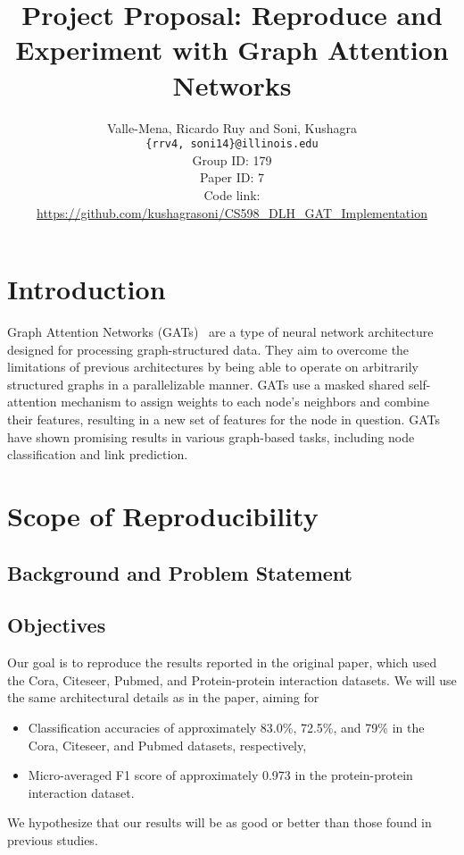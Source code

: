 \documentclass{article}
\title{Project Proposal: Reproduce and Experiment with Graph Attention Networks}
\author
{Valle-Mena, Ricardo Ruy and Soni, Kushagra \\
    \texttt{\{rrv4, soni14\}@illinois.edu}
    \\[2em]
    Group ID: 179\\
    Paper ID: 7\\
    Code link: \url{https://github.com/kushagrasoni/CS598_DLH_GAT_Implementation}
    \\[2em]
}
\begin{document}
    \maketitle

    \section{Introduction}\label{sec:introduction}

    Graph Attention Networks (GATs)~\cite{velickovic2018graph} are a type of neural network architecture designed for
    processing graph-structured data.
    They aim to overcome the limitations of previous architectures by being able to operate on arbitrarily structured graphs in a parallelizable manner.
    GATs use a masked shared self-attention mechanism to assign weights to each node's neighbors and combine their features, resulting in a new set of features for the node in question.
    GATs have shown promising results in various graph-based tasks, including node classification and link prediction.

    \section{Scope of Reproducibility}\label{sec:scope-of-reproducibility}

    \subsection{Background and Problem Statement}\label{sec:background-and-problem-statement}
    

    \subsection{Objectives}\label{sec:objectives}
    Our goal is to reproduce the results reported in the original paper, which used the Cora, Citeseer, Pubmed, and Protein-protein interaction datasets.
    We will use the same architectural details as in the paper, aiming for
    \begin{itemize}
        \item Classification accuracies of approximately 83.0\%, 72.5\%, and 79\% in the Cora, Citeseer, and Pubmed
        datasets, respectively,
        \item Micro-averaged F1 score of approximately 0.973 in the protein-protein interaction dataset.
    \end{itemize}
    We hypothesize that our results will be as good or better than those found in previous studies.
\end{document}
